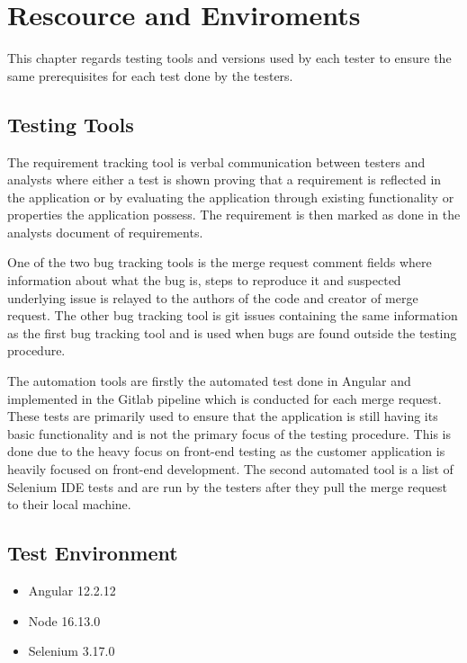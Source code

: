 \section{Rescource and Enviroments}
This chapter regards testing tools and versions used by each tester to ensure the same prerequisites for each test done by the testers.

\subsection{Testing Tools}
The requirement tracking tool is verbal communication between testers and analysts where either a test is shown proving that a requirement is reflected in the application or by evaluating the application through existing functionality or properties the application possess. The requirement is then marked as done in the analysts document of requirements.\newline

\noindent One of the two bug tracking tools is the merge request comment fields where information about what the bug is, steps to reproduce it and suspected underlying issue is relayed to the authors of the code and creator of merge request. The other bug tracking tool is git issues containing the same information as the first bug tracking tool and is used when bugs are found outside the testing procedure.\newline

\noindent The automation tools are firstly the automated test done in Angular and implemented in the Gitlab pipeline which is conducted for each merge request. These tests are primarily used to ensure that the application is still having its basic functionality and is not the primary focus of the testing procedure. This is done due to the heavy focus on front-end testing as the customer application is heavily focused on front-end development. The second automated tool is a list of Selenium IDE tests and are run by the testers after they pull the merge request to their local machine.

\subsection{Test Environment}
\begin{itemize}
  \item Angular 12.2.12 %
  \item Node 16.13.0
  \item Selenium 3.17.0
\end{itemize}

